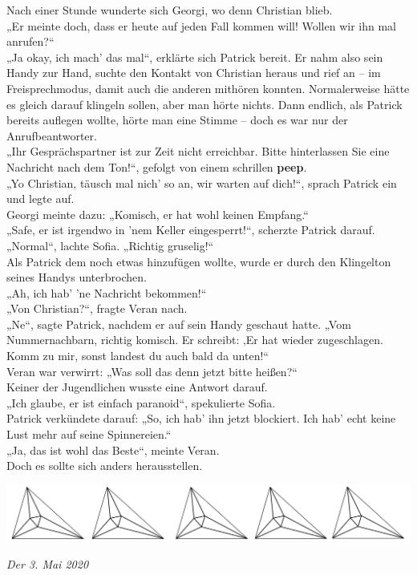 \documentclass[oneside]{memoir}
\newcommand{\parasep}{
\bigskip
\bigskip
\begin{center} 
   \includegraphics[scale=.08]{parasep5.jpg} 
\end{center}
\bigskip
\bigskip
}
\begin{document}
\bigskip
\noindent Nach einer Stunde wunderte sich Georgi, wo denn Christian blieb. \\
„Er meinte doch, dass er heute auf jeden Fall kommen will! Wollen wir ihn mal anrufen?“ \\
„Ja okay, ich mach' das mal“, erklärte sich Patrick bereit. Er nahm also sein Handy zur Hand, suchte den Kontakt von Christian heraus und rief an -- im Freisprechmodus, damit auch die anderen mithören konnten.
Normalerweise hätte es gleich darauf klingeln sollen, aber man hörte nichts. Dann endlich, als Patrick bereits auflegen wollte, hörte man eine Stimme -- doch es war nur der Anrufbeantworter. \\
„Ihr Gesprächspartner ist zur Zeit nicht erreichbar. Bitte hinterlassen Sie eine Nachricht nach dem Ton!“, gefolgt von einem schrillen \textbf{peep}. \\
„Yo Christian, täusch mal nich' so an, wir warten auf dich!“, sprach Patrick ein und legte auf. \\
Georgi meinte dazu: „Komisch, er hat wohl keinen Empfang.“ \\
„Safe, er ist irgendwo in 'nem Keller eingesperrt!“, scherzte Patrick darauf. \\
„Normal“, lachte Sofia. „Richtig gruselig!“ \\
Als Patrick dem noch etwas hinzufügen wollte, wurde er durch den Klingelton seines Handys unterbrochen. \\
„Ah, ich hab' 'ne Nachricht bekommen!“ \\
„Von Christian?“, fragte Veran nach. \\
„Ne“, sagte Patrick, nachdem er auf sein Handy geschaut hatte. „Vom Nummernachbarn, richtig komisch. Er schreibt: ‚Er hat wieder zugeschlagen. Komm zu mir, sonst landest du auch bald da unten!\grq“ \\
Veran war verwirrt: „Was soll das denn jetzt bitte heißen?“ \\
Keiner der Jugendlichen wusste eine Antwort darauf. \\
„Ich glaube, er ist einfach paranoid“, spekulierte Sofia. \\
Patrick verkündete darauf: „So, ich hab' ihn jetzt blockiert. Ich hab' echt keine Lust mehr auf seine Spinnereien.“ \\
„Ja, das ist wohl das Beste“, meinte Veran. \\
Doch es sollte sich anders herausstellen.
     
\parasep

\newpage
\textit{Der 3. Mai 2020}
\end{document}
